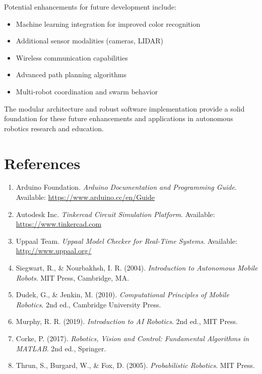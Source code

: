 \documentclass[12pt,a4paper]{article}
\begin{document}
Potential enhancements for future development include:

\begin{itemize}
    \item Machine learning integration for improved color recognition
    \item Additional sensor modalities (cameras, LIDAR)
    \item Wireless communication capabilities
    \item Advanced path planning algorithms
    \item Multi-robot coordination and swarm behavior
\end{itemize}

The modular architecture and robust software implementation provide a solid foundation for these future enhancements and applications in autonomous robotics research and education.

\section{References}

\begin{enumerate}
    \item Arduino Foundation. \textit{Arduino Documentation and Programming Guide}. Available: \url{https://www.arduino.cc/en/Guide}
    
    \item Autodesk Inc. \textit{Tinkercad Circuit Simulation Platform}. Available: \url{https://www.tinkercad.com}
    
    \item Uppaal Team. \textit{Uppaal Model Checker for Real-Time Systems}. Available: \url{http://www.uppaal.org/}
    
    \item Siegwart, R., \& Nourbakhsh, I. R. (2004). \textit{Introduction to Autonomous Mobile Robots}. MIT Press, Cambridge, MA.
    
    \item Dudek, G., \& Jenkin, M. (2010). \textit{Computational Principles of Mobile Robotics}. 2nd ed., Cambridge University Press.
    
    \item Murphy, R. R. (2019). \textit{Introduction to AI Robotics}. 2nd ed., MIT Press.
    
    \item Corke, P. (2017). \textit{Robotics, Vision and Control: Fundamental Algorithms in MATLAB}. 2nd ed., Springer.
    
    \item Thrun, S., Burgard, W., \& Fox, D. (2005). \textit{Probabilistic Robotics}. MIT Press.
\end{enumerate}
\end{document}
